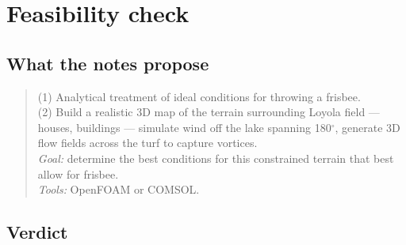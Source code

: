 %
%
%

\section{Feasibility check}
\label{sec:feas}

\subsection{What the notes propose}

\begin{quote}
(1) Analytical treatment of ideal conditions for throwing a frisbee.\\
(2) Build a realistic 3D map of the terrain surrounding Loyola field --- houses, buildings --- simulate wind off the lake spanning 180$^\circ$, generate 3D flow fields across the turf to capture vortices.\\
\emph{Goal:} determine the best conditions for this constrained terrain that best allow for frisbee.\\
\emph{Tools:} OpenFOAM or COMSOL.
\end{quote}

\subsection{Verdict}
\label{sec:feasibility-verdict}

